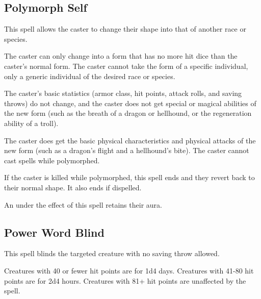 \begin{multicols*}{2}
\subsection{Polymorph Self}\label{spell:Polymorph Self}

This spell allows the caster to change their shape into that of another race or species.

The caster can only change into a form that has no more hit dice than the caster’s normal form. The caster cannot take the form of a specific individual, only a generic individual of the desired race or species.

The caster’s basic statistics (armor class, hit points, attack rolls, and saving throws) do not change, and the caster does not get special or magical abilities of the new form (such as the breath of a dragon or hellhound, or the regeneration ability of a troll).

The caster does get the basic physical characteristics and physical attacks of the new form (such as a dragon’s flight and a hellhound’s bite). The caster cannot cast spells while polymorphed.

If the caster is killed while polymorphed, this spell ends and they revert back to their normal shape. It also ends if dispelled.

An  under the effect of this spell retains their aura.

\subsection{Power Word Blind}\label{spell:Power Word Blind}

This spell blinds the targeted creature with no saving throw allowed.

Creatures with 40 or fewer hit points are  for 1d4 days. Creatures with 41-80 hit points are  for 2d4 hours. Creatures with 81+ hit points are unaffected by the spell.


\end{multicols*}
